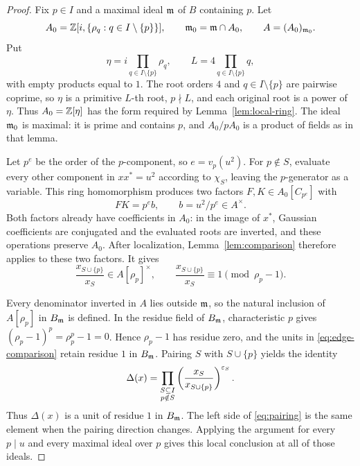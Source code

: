\begin{proof}
Fix \(p\in I\) and a maximal ideal \(\mathfrak m\) of \(B\) containing \(p\).
Let
\[
 A_0=\mathbb Z[i,\{\rho_q:q\in I\setminus\{p\}\}],\qquad
 \mathfrak m_0=\mathfrak m\cap A_0,\qquad A=(A_0)_{\mathfrak m_0}.
\]
Put
\[
 \eta=i\prod_{q\in I\setminus\{p\}}\rho_q,\qquad
 L=4\prod_{q\in I\setminus\{p\}}q,
\]
with empty products equal to \(1\). The root orders \(4\) and
\(q\in I\setminus\{p\}\) are pairwise coprime, so \(\eta\) is a
primitive \(L\)-th root, \(p\nmid L\), and each original root is a
power of \(\eta\). Thus \(A_0=\mathbb Z[\eta]\) has the form
required by Lemma~\ref{lem:local-ring}. The ideal \(\mathfrak m_0\) is maximal:
it is prime and contains \(p\), and \(A_0/pA_0\) is a product of fields
as in that lemma.

Let \(p^e\) be the order of the \(p\)-component, so \(e=v_p(u^2)\).
For \(p\notin S\), evaluate every other component in \(xx^*=u^2\)
according to \(\chi_S\), leaving the \(p\)-generator as a variable.
This ring homomorphism produces two factors \(F,K\in A_0[C_{p^e}]\)
with
\[
 FK=p^e b,\qquad b=u^2/p^e\in A^\times.
\]
Both factors already have coefficients in \(A_0\): in the image of
\(x^*\), Gaussian coefficients are conjugated and the evaluated
roots are inverted, and these operations preserve \(A_0\).
After localization, Lemma~\ref{lem:comparison} therefore applies
to these two factors. It gives
\begin{equation}\label{eq:edge-comparison}
 \frac{x_{S\cup\{p\}}}{x_S}\in A[\rho_p]^\times,
 \qquad
 \frac{x_{S\cup\{p\}}}{x_S}\equiv1\pmod{\rho_p-1}.
\end{equation}

Every denominator inverted in \(A\) lies outside \(\mathfrak m\), so the
natural inclusion of \(A[\rho_p]\) in \(B_{\mathfrak m}\) is defined.
In the residue field of \(B_{\mathfrak m}\), characteristic \(p\) gives
\((\rho_p-1)^p=\rho_p^p-1=0\). Hence \(\rho_p-1\) has residue zero,
and the units in \eqref{eq:edge-comparison} retain residue \(1\)
in \(B_{\mathfrak m}\). Pairing \(S\) with \(S\cup\{p\}\) yields the identity
\begin{equation}\label{eq:pairing}
 \Delta(x)=\prod_{\substack{S\subseteq I\\p\notin S}}
 \left(\frac{x_S}{x_{S\cup\{p\}}}\right)^{\varepsilon_S}.
\end{equation}
Thus \(\Delta(x)\) is a unit of residue \(1\) in \(B_{\mathfrak m}\).
The left side of \eqref{eq:pairing} is the same element when the
pairing direction changes. Applying the argument for every \(p\mid u\)
and every maximal ideal over \(p\) gives this local conclusion at all
of those ideals.


\end{proof}
